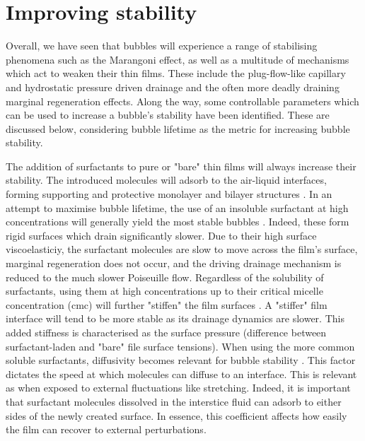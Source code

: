\documentclass[a4paper,12pt]{article}
\numberwithin{equation}{section}
\numberwithin{figure}{section}
\numberwithin{table}{section}
\begin{document}
\section{Improving stability}
Overall, we have seen that bubbles will experience a range of stabilising phenomena such as the Marangoni effect, as well as a multitude of mechanisms which act to weaken their thin films. These include the plug-flow-like capillary and hydrostatic pressure driven drainage and the often more deadly draining marginal regeneration effects. Along the way, some controllable parameters which can be used to increase a bubble's stability have been identified. These are discussed below, considering bubble lifetime as the metric for increasing bubble stability.

The addition of surfactants to pure or "bare" thin films will always increase their stability. The introduced molecules will adsorb to the air-liquid interfaces, forming supporting and protective monolayer and bilayer structures \cite{Gast1997, Mysels1968Nomenclature}. In an attempt to maximise bubble lifetime, the use of an insoluble surfactant at high concentrations will generally yield the most stable bubbles \cite{Petit2015, ChampougnyNotBare2016, Bhamla2017}. Indeed, these form rigid surfaces which drain significantly slower. Due to their high surface viscoelasticiy, the surfactant molecules are slow to move across the film's surface, marginal regeneration does not occur, and the driving drainage mechanism is reduced to the much slower Poiseuille flow. Regardless of the solubility of surfactants, using them at high concentrations up to their critical micelle concentration (cmc) will further "stiffen" the film surfaces \cite{Bhamla2017}. A "stiffer" film interface will tend to be more stable as its drainage dynamics are slower. This added stiffness is characterised as the surface pressure (difference between surfactant-laden and "bare" file surface tensions). When using the more common soluble surfactants, diffusivity becomes relevant for bubble stability \cite{deGennesYoung2001}. This factor dictates the speed at which molecules can diffuse to an interface. This is relevant as when exposed to external fluctuations like stretching. Indeed, it is important that surfactant molecules dissolved in the interstice fluid can adsorb to either sides of the newly created surface. In essence, this coefficient affects how easily the film can recover to external perturbations.
\end{document}
